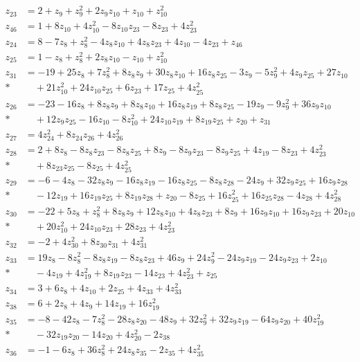 \begin{align*}
z_{23}&=2+z_{9}+z_{9}^{2}+2z_{9} z_{10}+z_{10}+z_{10}^{2}\\[3pt]
z_{46}&=1+8z_{10}+4z_{10}^{2}-8z_{10} z_{23}-8z_{23}+4z_{23}^{2}\\[3pt]
z_{24}&=8-7z_{8}+z_{8}^{2}-4z_{8} z_{10}+4z_{8} z_{23}+4z_{10}-4z_{23}+z_{46}\\[3pt]
z_{25}&=1-z_{8}+z_{8}^{2}+2z_{8} z_{10}-z_{10}+z_{10}^{2}\\[3pt]
z_{31}&=-19+25z_{8}+7z_{8}^{2}+8z_{8} z_{9}+30z_{8} z_{10}+16z_{8} z_{25}-3z_{9}-5z_{9}^{2}+4z_{9} z_{25}+27z_{10}\\*
&\quad{}+21z_{10}^{2}+24z_{10} z_{25}+6z_{23}+17z_{25}+4z_{25}^{2}\\[3pt]
z_{26}&=-23-16z_{8}+8z_{8} z_{9}+8z_{8} z_{10}+16z_{8} z_{19}+8z_{8} z_{25}-19z_{9}-9z_{9}^{2}+36z_{9} z_{10}\\*
&\quad{}+12z_{9} z_{25}-16z_{10}-8z_{10}^{2}+24z_{10} z_{19}+8z_{19} z_{25}+z_{20}+z_{31}\\[3pt]
z_{27}&=4z_{24}^{2}+8z_{24} z_{26}+4z_{26}^{2}\\[3pt]
z_{28}&=2+8z_{8}-8z_{8} z_{23}-8z_{8} z_{25}+8z_{9}-8z_{9} z_{23}-8z_{9} z_{25}+4z_{19}-8z_{23}+4z_{23}^{2}\\*
&\quad{}+8z_{23} z_{25}-8z_{25}+4z_{25}^{2}
\end{align*}
\begin{align*}
z_{29}&=-6-4z_{8}-32z_{8} z_{9}-16z_{8} z_{19}-16z_{8} z_{25}-8z_{8} z_{28}-24z_{9}+32z_{9} z_{25}+16z_{9} z_{28}\\*
&\quad{}-12z_{19}+16z_{19} z_{25}+8z_{19} z_{28}+z_{20}-8z_{25}+16z_{25}^{2}+16z_{25} z_{28}-4z_{28}+4z_{28}^{2}\\[3pt]
z_{30}&=-22+5z_{8}+z_{8}^{2}+8z_{8} z_{9}+12z_{8} z_{10}+4z_{8} z_{23}+8z_{9}+16z_{9} z_{10}+16z_{9} z_{23}+20z_{10}\\*
&\quad{}+20z_{10}^{2}+24z_{10} z_{23}+28z_{23}+4z_{23}^{2}\\[3pt]
z_{32}&=-2+4z_{30}^{2}+8z_{30} z_{31}+4z_{31}^{2}\\[3pt]
z_{33}&=19z_{8}-8z_{8}^{2}-8z_{8} z_{19}-8z_{8} z_{23}+46z_{9}+24z_{9}^{2}-24z_{9} z_{19}-24z_{9} z_{23}+2z_{10}\\*
&\quad{}-4z_{19}+4z_{19}^{2}+8z_{19} z_{23}-14z_{23}+4z_{23}^{2}+z_{25}\\[3pt]
z_{34}&=3+6z_{8}+4z_{10}+2z_{25}+4z_{33}+4z_{33}^{2}\\[3pt]
z_{38}&=6+2z_{8}+4z_{9}+14z_{19}+16z_{19}^{2}\\[3pt]
z_{35}&=-8-42z_{8}-7z_{8}^{2}-28z_{8} z_{20}-48z_{9}+32z_{9}^{2}+32z_{9} z_{19}-64z_{9} z_{20}+40z_{19}^{2}\\*
&\quad{}-32z_{19} z_{20}-14z_{20}+4z_{20}^{2}-2z_{38}\\[3pt]
z_{36}&=-1-6z_{8}+36z_{8}^{2}+24z_{8} z_{35}-2z_{35}+4z_{35}^{2}
\end{align*}
